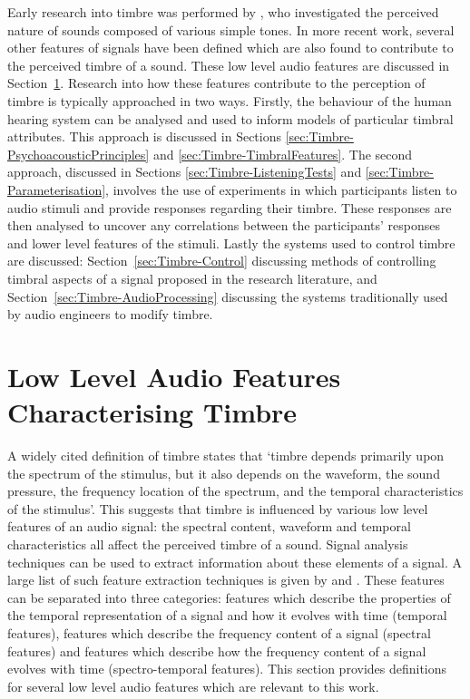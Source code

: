 	Early research into timbre was performed by \citet{helmholtz1875on}, who investigated the perceived nature of
	sounds composed of various simple tones. In more recent work, several other features of signals have been defined
	which are also found to contribute to the perceived timbre of a sound.  These low level audio features are
	discussed in Section~\ref{sec:Timbre-LowLevelFeatures}.  Research into how these features contribute to the
	perception of timbre is typically approached in two ways. Firstly, the behaviour of the human hearing system can be
	analysed and used to inform models of particular timbral attributes. This approach is discussed in Sections
	\ref{sec:Timbre-PsychoacousticPrinciples} and \ref{sec:Timbre-TimbralFeatures}. The second approach, discussed in
	Sections \ref{sec:Timbre-ListeningTests} and \ref{sec:Timbre-Parameterisation}, involves the use of experiments in
	which participants listen to audio stimuli and provide responses regarding their timbre.  These responses are then
	analysed to uncover any correlations between the participants' responses and lower level features of the stimuli.
	Lastly the systems used to control timbre are discussed: Section~\ref{sec:Timbre-Control} discussing methods of
	controlling timbral aspects of a signal proposed in the research literature, and
	Section~\ref{sec:Timbre-AudioProcessing} discussing the systems traditionally used by audio engineers to modify
	timbre.

\section{Low Level Audio Features Characterising Timbre}
\label{sec:Timbre-LowLevelFeatures}
	A widely cited definition of timbre \citep{ASA1960american} states that `timbre depends primarily upon the
	spectrum of the stimulus, but it also depends on the waveform, the sound pressure, the frequency location of the
	spectrum, and the temporal characteristics of the stimulus'. This suggests that timbre is influenced by various
	low level features of an audio signal: the spectral content, waveform and temporal characteristics all affect the
	perceived timbre of a sound. Signal analysis techniques can be used to extract information about these elements of
	a signal.  A large list of such feature extraction techniques is given by \citet{peeters2004a} and
	\citet{bullock2008implementing}. These features can be separated into three categories: features which describe the
	properties of the temporal representation of a signal and how it evolves with time (temporal features), features
	which describe the frequency content of a signal (spectral features) and features which describe how the frequency
	content of a signal evolves with time (spectro-temporal features). This section provides definitions for several
	low level audio features which are relevant to this work.


